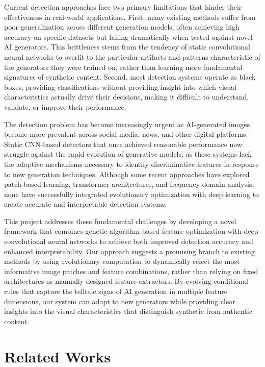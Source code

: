\documentclass[runningheads]{llncs}
\begin{document}
Current detection approaches face two primary limitations that hinder their effectiveness in real-world applications. First, many existing methods suffer from poor generalization across different generation models, often achieving high accuracy on specific datasets but failing dramatically when tested against novel AI generators. This brittleness stems from the tendency of static convolutional neural networks to overfit to the particular artifacts and patterns characteristic of the generators they were trained on, rather than learning more fundamental signatures of synthetic content. Second, most detection systems operate as black boxes, providing classifications without providing insight into which visual characteristics actually drive their decisions, making it difficult to understand, validate, or improve their performance.

The detection problem has become increasingly urgent as AI-generated images become more prevalent across social media, news, and other digital platforms. Static CNN-based detectors that once achieved reasonable performance now struggle against the rapid evolution of generative models, as these systems lack the adaptive mechanisms necessary to identify discriminative features in response to new generation techniques. Although some recent approaches have explored patch-based learning, transformer architectures, and frequency domain analysis, none have successfully integrated evolutionary optimization with deep learning to create accurate and interpretable detection systems.

This project addresses these fundamental challenges by developing a novel framework that combines genetic algorithm-based feature optimization with deep convolutional neural networks to achieve both improved detection accuracy and enhanced interpretability. Our approach suggests a promising branch to existing methods by using evolutionary computation to dynamically select the most informative image patches and feature combinations, rather than relying on fixed architectures or manually designed feature extractors. By evolving conditional rules that capture the telltale signs of AI generation in multiple feature dimensions, our system can adapt to new generators while providing clear insights into the visual characteristics that distinguish synthetic from authentic content.

\section{Related Works}
\end{document}
